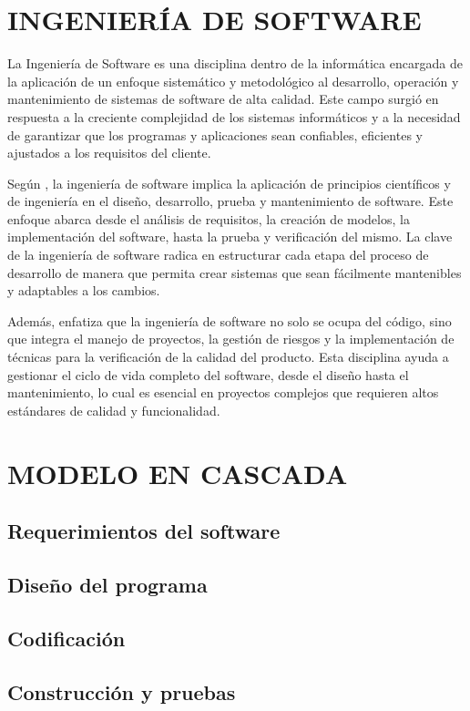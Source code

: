 	\section{INGENIERÍA DE SOFTWARE}
		La Ingeniería de Software es una disciplina dentro de la informática encargada de la aplicación de un enfoque sistemático y metodológico al desarrollo, operación y mantenimiento de sistemas de software de alta calidad. Este campo surgió en respuesta a la creciente complejidad de los sistemas informáticos y a la necesidad de garantizar que los programas y aplicaciones sean confiables, eficientes y ajustados a los requisitos del cliente.
		
		Según \textcite{sommerville2011introduccion}, la ingeniería de software implica la aplicación de principios científicos y de ingeniería en el diseño, desarrollo, prueba y mantenimiento de software. Este enfoque abarca desde el análisis de requisitos, la creación de modelos, la implementación del software, hasta la prueba y verificación del mismo. La clave de la ingeniería de software radica en estructurar cada etapa del proceso de desarrollo de manera que permita crear sistemas que sean fácilmente mantenibles y adaptables a los cambios.
		
		Además, \textcite{pressman2010ingenieria} enfatiza que la ingeniería de software no solo se ocupa del código, sino que integra el manejo de proyectos, la gestión de riesgos y la implementación de técnicas para la verificación de la calidad del producto. Esta disciplina ayuda a gestionar el ciclo de vida completo del software, desde el diseño hasta el mantenimiento, lo cual es esencial en proyectos complejos que requieren altos estándares de calidad y funcionalidad.
		
	\section{MODELO EN CASCADA}
	\subsection{Requerimientos del software}
	\subsection{Diseño del programa}
	\subsection{Codificación}
	\subsection{Construcción y pruebas}
